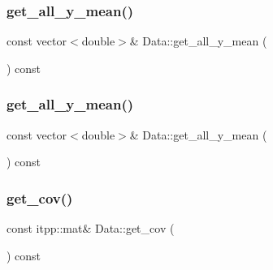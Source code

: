 \mbox{\label{classData_a5b3bba18a4893fc7cb415beaed1ef859}} 
\subsubsection{\texorpdfstring{get\_all\_y\_mean()}{get\_all\_y\_mean()}\hspace{0.1cm}{\footnotesize\ttfamily [1/2]}}
{\footnotesize\ttfamily const vector$<$double$>$\& Data\+::get\+\_\+all\+\_\+y\+\_\+mean (\begin{DoxyParamCaption}{ }\end{DoxyParamCaption}) const\hspace{0.3cm}{\ttfamily [inline]}}

\mbox{\label{classData_a5b3bba18a4893fc7cb415beaed1ef859}} 
\subsubsection{\texorpdfstring{get\_all\_y\_mean()}{get\_all\_y\_mean()}\hspace{0.1cm}{\footnotesize\ttfamily [2/2]}}
{\footnotesize\ttfamily const vector$<$double$>$\& Data\+::get\+\_\+all\+\_\+y\+\_\+mean (\begin{DoxyParamCaption}{ }\end{DoxyParamCaption}) const\hspace{0.3cm}{\ttfamily [inline]}}

\mbox{\label{classData_a19b920edbea6526f6db747bfe1c4c1c2}} 
\subsubsection{\texorpdfstring{get\_cov()}{get\_cov()}\hspace{0.1cm}{\footnotesize\ttfamily [1/2]}}
{\footnotesize\ttfamily const itpp\+::mat\& Data\+::get\+\_\+cov (\begin{DoxyParamCaption}{ }\end{DoxyParamCaption}) const\hspace{0.3cm}{\ttfamily [inline]}}

